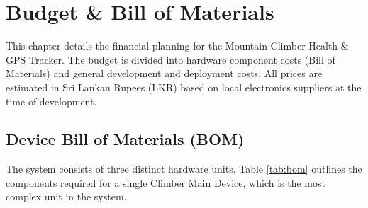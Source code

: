 \chapter{Budget \& Bill of Materials}
\label{ch:budget}

This chapter details the financial planning for the Mountain Climber Health \& GPS Tracker. The budget is divided into hardware component costs (Bill of Materials) and general development and deployment costs. All prices are estimated in Sri Lankan Rupees (LKR) based on local electronics suppliers at the time of development.

\section{Device Bill of Materials (BOM)}

The system consists of three distinct hardware units. Table \ref{tab:bom} outlines the components required for a single Climber Main Device, which is the most complex unit in the system.

\begin{table}[htbp]
    \centering
    \caption{Bill of Materials for a Single Climber Main Device}
    \label{tab:bom}
\end{table}

